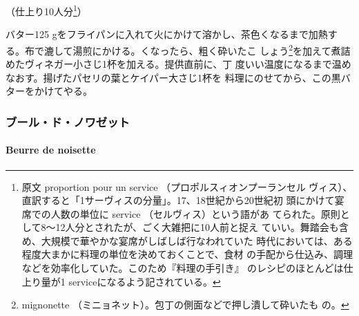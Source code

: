 \begin{recette}

（仕上り10人分\footnote{原文 proportion pour un service
  （プロポルスィオンプーランセル
  ヴィス）、直訳すると「1サーヴィスの分量」。17、18世紀から20世紀初
  頭にかけて宴席での人数の単位に service （セルヴィス）という語があ
  てられた。原則として8〜12人分とされたが、ごく大雑把に10人前と捉え
  ていい。舞踏会も含め、大規模で華やかな宴席がしばしば行なわれていた
  時代においては、ある程度大まかに料理の単位を決めておくことで、食材
  の手配から仕込み、調理などを効率化していた。このため『料理の手引き』
  のレシピのほとんどは仕上り量が1 serviceになるよう記されている。}）

バター125 gをフライパンに入れて火にかけて溶かし、茶色くなるまで加熱す
る。布で漉して湯煎にかける。くなったら、粗く砕いたこ
しょう\footnote{mignonette
  （ミニョネット）。包丁の側面などで押し潰して砕いたも の。}を加えて煮詰めたヴィネガー小さじ1杯を加える。提供直前に、丁
度いい温度になるまで温めなおす。揚げたパセリの葉とケイパー大さじ1杯を
料理にのせてから、この黒バターをかけてやる。

\maeaki

\hypertarget{ux30d6ux30fcux30ebux30c9ux30ceux30efux30bcux30c3ux30c8}{%
\subsubsection{ブール・ド・ノワゼット}\label{ux30d6ux30fcux30ebux30c9ux30ceux30efux30bcux30c3ux30c8}}

\hypertarget{beurre-de-noisette}{%
\paragraph{Beurre de noisette}\label{beurre-de-noisette}}



\end{recette}
